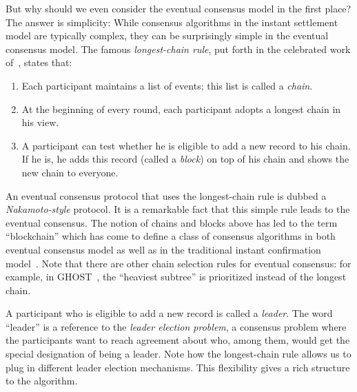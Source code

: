 But why should we even consider the eventual consensus model in the first place? 
The answer is simplicity: 
While consensus algorithms in the instant settlement model 
are typically complex, 
they can be surprisingly simple in the eventual consensus model. 
The famous \emph{longest-chain rule}, put forth in the 
celebrated work of~\citet{Nakamoto2008}, states that:
\begin{enumerate}
  \item Each participant maintains a list of events; 
  this list is called a \emph{chain}.

  \item At the beginning of every round, 
  each participant adopts a longest chain in his view.

  \item A participant can test whether he is eligible to add a new record to his chain. 
  If he is, he adds this record (called a \emph{block}) on top of his chain 
  and shows the new chain to everyone.
\end{enumerate}

An eventual consensus protocol that uses the longest-chain rule is dubbed a \emph{Nakamoto-style} protocol.
It is a remarkable fact that this simple rule leads to the eventual consensus. 
The notion of chains and blocks above has led to the term ``blockchain'' 
which has come to define a class of consensus algorithms 
in both eventual consensus model as well as in the traditional 
instant confirmation model~\cite{ConsensusBlockchain,GK18}. 
Note that there are other chain selection rules for eventual consensus: 
for example, in GHOST~\cite{Ghost},
the ``heaviest subtree'' is prioritized instead of the longest chain. 

A participant who is eligible to add a new record is called a \emph{leader}. 
The word ``leader'' is a reference to the \emph{leader election problem}, 
a consensus problem where the participants want to 
reach agreement about who, among them, would get 
the special designation of being a leader.
Note how the longest-chain rule allows us to plug in 
different leader election mechanisms. 
This flexibility gives a rich structure to the algorithm.

